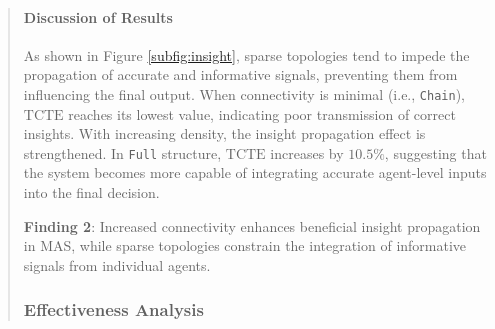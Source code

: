 \documentclass[11pt]{article}
\begin{document}
\begin{abstract}
\paragraph{Discussion of Results} 
As shown in Figure \ref{subfig:insight}, sparse topologies tend to impede the propagation of accurate and informative signals, preventing them from influencing the final output. When connectivity is minimal (i.e., \texttt{Chain}), $\text{TCTE}$ reaches its lowest value, indicating poor transmission of correct insights. With increasing density, the insight propagation effect is strengthened. In \texttt{Full} structure, $\text{TCTE}$ increases by $10.5\%$, suggesting that the system becomes more capable of integrating accurate agent-level inputs into the final decision. 

\begin{tcolorbox}[
    enhanced, %
    colback=white, %
    colframe=deepgreen, %
    boxrule=1pt, %
    arc=5pt, %
    left=5pt, right=5pt, %
    top=5pt, bottom=5pt, %
    width=\linewidth %
]
\textbf{\textcolor{deepgreen}{Finding 2}}: Increased connectivity enhances beneficial insight propagation in MAS, while sparse topologies constrain the integration of informative signals from individual agents.
\end{tcolorbox}




\subsubsection{Effectiveness Analysis}


\end{abstract}
\end{document}

